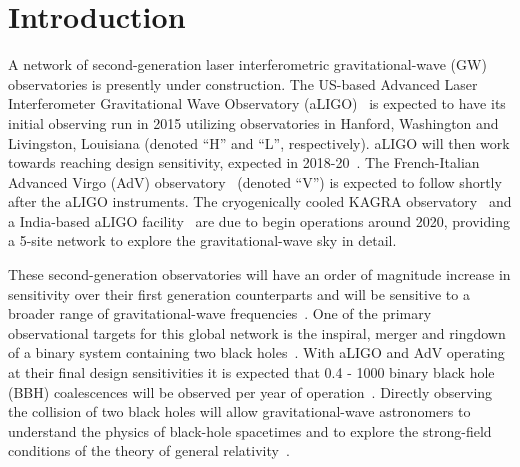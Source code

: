 \section{Introduction}
\label{sec:introduction}
A network of second-generation laser interferometric
gravitational-wave (GW) observatories is presently under construction.
The US-based Advanced Laser Interferometer Gravitational Wave 
Observatory (aLIGO)~\cite{Harry:2010zz} is expected to have its
initial observing run in 2015 utilizing observatories in Hanford,
Washington and Livingston, Louisiana (denoted ``H'' and ``L'', respectively). 
aLIGO will then work towards reaching design
sensitivity, expected in 2018-20~\cite{Aasi:2013wya}. The
French-Italian Advanced Virgo (AdV) observatory~\cite{Accadia:2011zzc,aVIRGO}
(denoted ``V'') is expected to follow shortly after the
aLIGO instruments. The cryogenically cooled KAGRA
observatory~\cite{Kuroda:2010zzb,Somiya:2011np} and a India-based aLIGO
facility~\cite{LIGODCC:M1100296,Unnikrishnan:2013qwa} are due to begin 
operations around
2020, providing a 5-site network to explore the gravitational-wave sky
in detail.

These second-generation observatories will have an order of magnitude
increase in sensitivity over their first generation counterparts and
will be sensitive to a broader range of gravitational-wave
frequencies~\cite{Harry:2010zz,aVIRGO,Somiya:2011np}. One of the
primary observational targets for this global network is the inspiral, merger 
and ringdown of a binary system containing two black 
holes~\cite{thorne.k:1987}. 
With aLIGO and AdV operating at their final design sensitivities
it is expected that 0.4 - 1000 binary black hole (BBH) coalescences
will be observed per year of operation~\cite{Abadie:2010cf}.  Directly
observing the collision of two black holes will allow
gravitational-wave astronomers to understand the physics of black-hole
spacetimes and to explore the strong-field conditions of the
theory of general relativity~\cite{Sathyaprakash:2009xs}.

